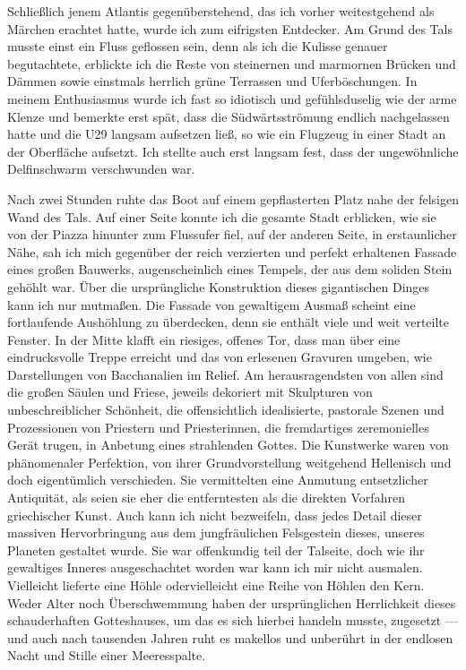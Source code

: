 \documentclass[a4paper]{memoir}
\begin{document}
Schließlich jenem Atlantis gegenüberstehend, das ich vorher weitestgehend als Märchen erachtet hatte, wurde ich zum eifrigsten Entdecker. Am Grund des Tals musste einst ein Fluss geflossen sein, denn als ich die Kulisse genauer begutachtete, erblickte ich die Reste von steinernen und marmornen Brücken und Dämmen sowie einstmals herrlich grüne Terrassen und Uferböschungen. In meinem Enthusiasmus wurde ich fast so idiotisch und gefühlsduselig wie der arme Klenze und bemerkte erst spät, dass die Südwärtsströmung endlich nachgelassen hatte und die U29 langsam aufsetzen ließ, so wie ein Flugzeug in einer Stadt an der Oberfläche aufsetzt. Ich stellte auch erst langsam fest, dass der ungewöhnliche Delfinschwarm verschwunden war.

Nach zwei Stunden ruhte das Boot auf einem gepflasterten Platz nahe der felsigen Wand des Tals. Auf einer Seite konnte ich die gesamte Stadt erblicken, wie sie von der Piazza hinunter zum Flussufer fiel, auf der anderen Seite, in erstaunlicher Nähe, sah ich mich gegenüber der reich verzierten und perfekt erhaltenen Fassade eines großen Bauwerks, augenscheinlich eines Tempels, der aus dem soliden Stein gehöhlt war.
Über die ursprüngliche Konstruktion dieses gigantischen Dinges kann ich nur mutmaßen. Die Fassade von gewaltigem Ausmaß scheint eine fortlaufende Aushöhlung zu überdecken, denn sie enthält viele und weit verteilte Fenster.
In der Mitte klafft ein riesiges, offenes Tor, dass man über eine eindrucksvolle Treppe erreicht und das von erlesenen Gravuren umgeben, wie Darstellungen von Bacchanalien im Relief. Am herausragendsten von allen sind die großen Säulen und Friese, jeweils dekoriert mit Skulpturen von unbeschreiblicher Schönheit, die offensichtlich idealisierte, pastorale Szenen und Prozessionen von Priestern und Priesterinnen, die fremdartiges zeremonielles Gerät trugen, in Anbetung eines strahlenden Gottes. Die Kunstwerke waren von phänomenaler Perfektion, von ihrer Grundvorstellung weitgehend Hellenisch und doch eigentümlich verschieden. Sie vermittelten eine Anmutung entsetzlicher Antiquität, als seien sie eher die entferntesten als die direkten Vorfahren griechischer Kunst. Auch kann ich nicht bezweifeln, dass jedes Detail dieser massiven Hervorbringung aus dem jungfräulichen Felsgestein dieses, unseres Planeten gestaltet wurde. Sie war offenkundig teil der Talseite, doch wie ihr gewaltiges Inneres ausgeschachtet worden war kann ich mir nicht ausmalen. Vielleicht lieferte eine Höhle odervielleicht eine Reihe von Höhlen den Kern. Weder Alter noch Überschwemmung haben der ursprünglichen Herrlichkeit dieses schauderhaften Gotteshauses, um das es sich hierbei handeln musste, zugesetzt --- und auch nach tausenden Jahren ruht es makellos und unberührt in der endlosen Nacht und Stille einer Meeresspalte.
\end{document}

